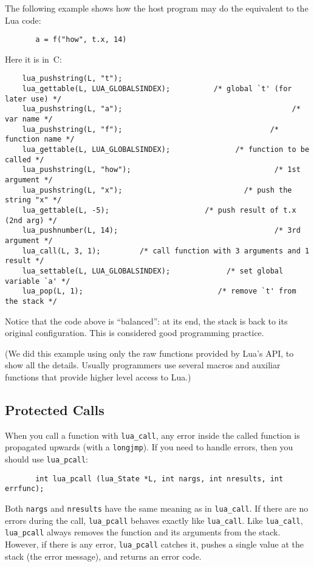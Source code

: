 \documentclass[11pt,twoside]{article}
\begin{document}
The following example shows how the host program may do the
equivalent to the Lua code:
\begin{verbatim}
       a = f("how", t.x, 14)
\end{verbatim}
Here it is in~C:
\begin{verbatim}
    lua_pushstring(L, "t");
    lua_gettable(L, LUA_GLOBALSINDEX);          /* global `t' (for later use) */
    lua_pushstring(L, "a");                                       /* var name */
    lua_pushstring(L, "f");                                  /* function name */
    lua_gettable(L, LUA_GLOBALSINDEX);               /* function to be called */
    lua_pushstring(L, "how");                                 /* 1st argument */
    lua_pushstring(L, "x");                            /* push the string "x" */
    lua_gettable(L, -5);                      /* push result of t.x (2nd arg) */
    lua_pushnumber(L, 14);                                    /* 3rd argument */
    lua_call(L, 3, 1);         /* call function with 3 arguments and 1 result */
    lua_settable(L, LUA_GLOBALSINDEX);             /* set global variable `a' */
    lua_pop(L, 1);                               /* remove `t' from the stack */
\end{verbatim}
Notice that the code above is ``balanced'':
at its end, the stack is back to its original configuration.
This is considered good programming practice.

(We did this example using only the raw functions provided by Lua's API,
to show all the details.
Usually programmers use several macros and auxiliar functions that
provide higher level access to Lua.)


\subsection{Protected Calls}\label{pcall}

When you call a function with \verb|lua_call|,
any error inside the called function is propagated upwards
(with a \verb|longjmp|).
If you need to handle errors,
then you should use \verb|lua_pcall|:
\begin{verbatim}
       int lua_pcall (lua_State *L, int nargs, int nresults, int errfunc);
\end{verbatim}
Both \verb|nargs| and \verb|nresults| have the same meaning as
in \verb|lua_call|.
If there are no errors during the call,
\verb|lua_pcall| behaves exactly like \verb|lua_call|.
Like \verb|lua_call|,
\verb|lua_pcall| always removes the function
and its arguments from the stack.
However, if there is any error,
\verb|lua_pcall| catches it,
pushes a single value at the stack (the error message),
and returns an error code.
\end{document}
